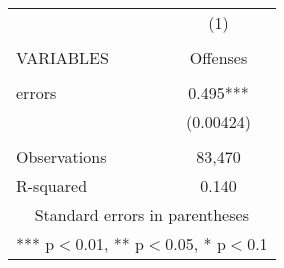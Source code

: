 \documentclass[]{article}
\begin{document}
\begin{tabular}{lc} \hline
 & (1) \\
 &  \\
VARIABLES & Offenses \\ \hline
 &  \\
errors & 0.495*** \\
 & (0.00424) \\
 &  \\
Observations & 83,470 \\
 R-squared & 0.140 \\ \hline
\multicolumn{2}{c}{ Standard errors in parentheses} \\
\multicolumn{2}{c}{ *** p$<$0.01, ** p$<$0.05, * p$<$0.1} \\
\end{tabular}
\end{document}
